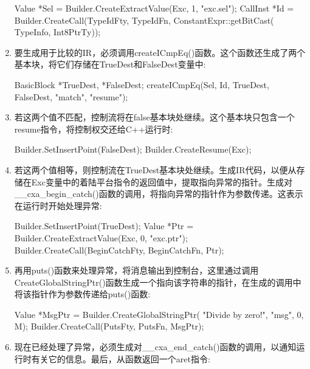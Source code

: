 \begin{enumerate}
\begin{cpp}
    Value *Sel =
        Builder.CreateExtractValue(Exc, {1}, "exc.sel");
    CallInst *Id =
        Builder.CreateCall(TypeIdFty, TypeIdFn,
                            {ConstantExpr::getBitCast(
                                TypeInfo, Int8PtrTy)});
\end{cpp}

\item
要生成用于比较的IR，必须调用createICmpEq()函数。这个函数还生成了两个基本块，将它们存储在TrueDest和FalseDest变量中:

\begin{cpp}
    BasicBlock *TrueDest, *FalseDest;
    createICmpEq(Sel, Id, TrueDest, FalseDest, "match",
                "resume");
\end{cpp}

\item
若这两个值不匹配，控制流将在false基本块处继续。这个基本块只包含一个resume指令，将控制权交还给C++运行时:

\begin{cpp}
    Builder.SetInsertPoint(FalseDest);
    Builder.CreateResume(Exc);
\end{cpp}

\item
若这两个值相等，则控制流在TrueDest基本块处继续。生成IR代码，以便从存储在Exc变量中的着陆平台指令的返回值中，提取指向异常的指针。生成对\_\_cxa\_begin\_catch()函数的调用，将指向异常的指针作为参数传递。这表示在运行时开始处理异常:

\begin{cpp}
    Builder.SetInsertPoint(TrueDest);
    Value *Ptr =
        Builder.CreateExtractValue(Exc, {0}, "exc.ptr");
    Builder.CreateCall(BeginCatchFty, BeginCatchFn,
                        {Ptr});
\end{cpp}

\item
再用puts()函数来处理异常，将消息输出到控制台，这里通过调用CreateGlobalStringPtr()函数生成一个指向该字符串的指针，在生成的调用中将该指针作为参数传递给puts()函数:

\begin{cpp}
    Value *MsgPtr = Builder.CreateGlobalStringPtr(
        "Divide by zero!", "msg", 0, M);
    Builder.CreateCall(PutsFty, PutsFn, {MsgPtr});
\end{cpp}

\item
现在已经处理了异常，必须生成对\_\_cxa\_end\_catch()函数的调用，以通知运行时有关它的信息。最后，从函数返回一个aret指令:

\begin{cpp}
    Builder.CreateCall(EndCatchFty, EndCatchFn);
    Builder.CreateRet(Int32Zero);
}
\end{cpp}

\end{enumerate}

